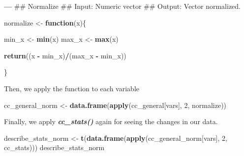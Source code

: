 \documentclass[11pt,]{article}
\newenvironment{Shaded}{\begin{snugshade}}{\end{snugshade}}
\newcommand{\KeywordTok}[1]{\textcolor[rgb]{0.13,0.29,0.53}{\textbf{#1}}}
\newcommand{\DecValTok}[1]{\textcolor[rgb]{0.00,0.00,0.81}{#1}}
\newcommand{\StringTok}[1]{\textcolor[rgb]{0.31,0.60,0.02}{#1}}
\newcommand{\ControlFlowTok}[1]{\textcolor[rgb]{0.13,0.29,0.53}{\textbf{#1}}}
\newcommand{\OperatorTok}[1]{\textcolor[rgb]{0.81,0.36,0.00}{\textbf{#1}}}
\newcommand{\NormalTok}[1]{#1}
\begin{document}
\begin{Shaded}
\begin{Highlighting}[]
\OperatorTok{---}
\NormalTok{## Normalize}
\NormalTok{## Input: Numeric vector}
\NormalTok{## Output: Vector normalized.}

\NormalTok{normalize <-}\StringTok{ }\ControlFlowTok{function}\NormalTok{(x)\{}
  
\NormalTok{  min_x <-}\StringTok{ }\KeywordTok{min}\NormalTok{(x)}
\NormalTok{  max_x <-}\StringTok{ }\KeywordTok{max}\NormalTok{(x)}
  
  \KeywordTok{return}\NormalTok{((x }\OperatorTok{-}\StringTok{ }\NormalTok{min_x)}\OperatorTok{/}\NormalTok{(max_x }\OperatorTok{-}\StringTok{ }\NormalTok{min_x))}
  
\NormalTok{\}}
\end{Highlighting}
\end{Shaded}

Then, we apply the function to each variable

\begin{Shaded}
\begin{Highlighting}[]
\NormalTok{cc_general_norm     <-}\StringTok{ }\KeywordTok{data.frame}\NormalTok{(}\KeywordTok{apply}\NormalTok{(cc_general[vars], }\DecValTok{2}\NormalTok{, normalize))}
\end{Highlighting}
\end{Shaded}

Finally, we apply \emph{\textbf{cc\_stats()}} again for seeing the
changes in our data.

\begin{Shaded}
\begin{Highlighting}[]
\NormalTok{describe_stats_norm <-}\StringTok{ }\KeywordTok{t}\NormalTok{(}\KeywordTok{data.frame}\NormalTok{(}\KeywordTok{apply}\NormalTok{(cc_general_norm[vars], }\DecValTok{2}\NormalTok{, cc_stats)))}
\NormalTok{describe_stats_norm}
\end{Highlighting}
\end{Shaded}
\end{document}
